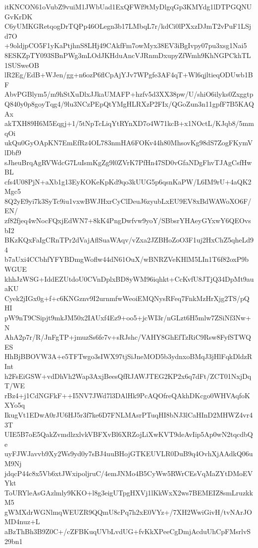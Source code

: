itKNCON61oVubZ9vuiM1JWbUad1ExQFWf9tMyDlgqGp3KMYdg1lDTPGQNUGvKrDK
C6yUMKGRetqogDrTQPp46OLegn3b17LMbqL7r/kdCi0lPXxzDJmT2vPuF1LSjd7O
+9oldjpCO5F1yKaPtjhnS8LHj49CAkfFm7owMyx38EV3iBgIvpy07pu3xsg1Nai5
8ESKZpTY093SBnPWg3mLOdJKHduAncVJRnmDxupyZfWmh9KhNGPCkhTL1SUSweOB
lR2Eg/EdB+WJen/gg+n6ozP6flCpAjYJv7WPgfe3AF4qT+Wl6qjltieqODUwb1BF
AbvPGBlym5/m9hStXuDlxJJkaUMAFP+hzfv5d3XX38pw/U/shiO6ilyks0Zxggtp
Q840y0p8goyTqg4/9lu3NCzPEpQtYMgHLRXzP2FIx/QGoZun3n11gpfF7B5KAQAx
akTXH89H6M5Eqgj+1/5tNpTcLiqYtRYnXD7o4W71kcB+x1NOctL/KJqb8/5mmqOi
ukQu0GyOApKN7EmEfRz4OL783nmHA6FOKv44h80MhsovKg98dS7ZogFKymVlDbf9
sJheuBrqAgRVWdcG7LuIsmKgZg9l0ZVrK7PfHn47SD0vGfaNDgFhvTJAgCsfHwBL
cfs4U08PjN+aXb1g13EyKOKeKpKd9qo3kUUG5p6qsnKaPW/L6IM9rU+4aQK2Mgc5
8Q2yE9yi7k3SyTc9iu1vxwBWJHxrCyClDeuJ6zyubLxEU9EV8xBdWAWoXO6F/EN/
zf82fjeq4wNocFQxjEdWN7+8kK4PngDwfvw9yoY/SBbsrYHAeyGYxwY6QEOvsbI2
BKzKQxFaIgCRnTPr2dVajAflSuaWAqv/vZxa2JZBHoZoO3F1uj2HxChZ5qheLd94
b7aUxi4CCbhfYFYBDmgWoflw44dN61OuX/wBNRZVeKHlM5LIn1T6f82oxP9bWGUE
khhJzWSG+IddEZUtdoU0CVnDplxBD8yWM96iqhkt+CcKvfU8JTjQ34DpMt9auaKU
Cyek2jIGx0g+f+c6KNGznv9I2urnmfwWeoiEMQNysRFeq7FnkMzHrXjg2TS/pQHI
pW9nT9CSipjt9mkJM50x2IAUxf4Ez9+oo5+jcWI3r/nGLzt6H5mlw7ZSiNf3Nw+N
AhA2p7r/R/JnFgTP+jmuzSs6fe7v+sRJshc/VAHY8GhEfTzRiC9Rsw8FyfSTWQES
HhBjBBOVW3A+e5TFTwgo3sIWX97tjSiJneMOD5b3ydnxoBMqJ3jHlFqkDldzRInt
h2FsEiGSW+vdDhVh2Wap3AxjBeesQfRJAWJTEG2KP2x6q7dFt/ZCT01NxjDqT/WE
rBz4+j1CdNGFkF++I5NV7JWd7l3DAlHk9PcAQOfreQAkhDKcgo0WHVAqfoKXYo5q
IkugVt1EDwA0rJU6HJ5r3f7ke6D7FNLMAsrPTuqHI8bNJ3lCaHInD2MHWZ4vr43T
UIE5B7oE5QakZvmdlzxlvkVBFXvBl6XRZojLiXwKVT9deAvIip5Ap0wN2tqcdbQe
uyFJWJavvb9Xy2Ws9yd0y7sBJ4uuBHojGTKEUVLR0DuB9q4OvhXjAAdkQ06uM9Nj
jdqcP44c8x5Vb6xtJWxipoljruC/4emJNMo4B5CyWw5RWrCEsVqMaZYtDMoEVYkt
ToURYleAsGAzlmly9KKO+l8g3eigUTpgHXVj1lKkWxX2ws7BEMEIZ8smLruzkkM5
gWMXdrWGNlmqWEUZR9QQmU8cPq7h2xE0VYz+/7XH2WwiGivH/tvNArJOMD4nuz+L
aBzThBh3B9Z0C+/cZFBKuqUVbLvdUG+fvKkXPeeCgDmjAcduUhCpFMsrlvS29bn1
